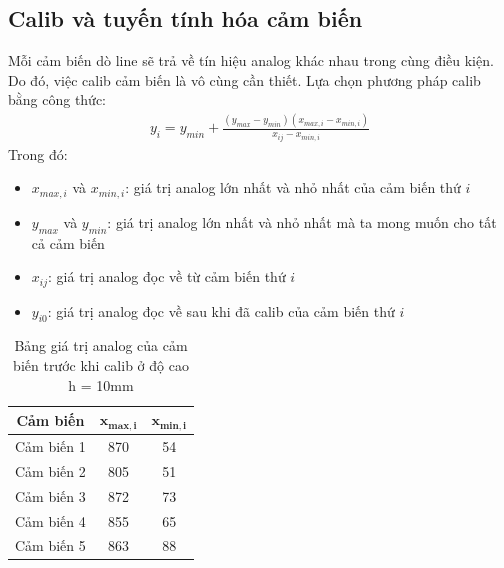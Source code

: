         \subsection{Calib và tuyến tính hóa cảm biến}
            \hspace*{0.6cm}Mỗi cảm biến dò line sẽ trả về tín hiệu analog khác nhau trong cùng điều kiện. Do đó, việc calib cảm biến là vô cùng cần thiết. Lựa chọn phương pháp calib bằng công thức:
            \begin{align}
                y_i = y_{min} + \frac{(y_{max} - y_{min})(x_{max, i} - x_{min, i})}{x_{ij} - x_{min, i}} 
                \label{eq:4-6}
            \end{align}
            Trong đó:
            \begin{itemize}
                \item $x_{max,i}$ và $x_{min,i}$: giá trị analog lớn nhất và nhỏ nhất của cảm biến thứ $i$
                \item $y_{max}$ và $y_{min}$: giá trị analog lớn nhất và nhỏ nhất mà ta mong muốn cho tất cả cảm biến
                \item $x_{ij}$: giá trị analog đọc về từ cảm biến thứ $i$
                \item $y_{i0}$: giá trị analog đọc về sau khi đã calib của cảm biến thứ $i$
            \end{itemize}
            \begin{table}[H]
                \centering
                \begin{tabular}{|c|c|c|}
                    \hline
                    \textbf{Cảm biến} & $\mathbf{x_{max,i}}$ & $\mathbf{x_{min,i}}$  \\
                    \hline
                    Cảm biến 1 & 870 & 54  \\
                    \hline
                    Cảm biến 2 & 805 & 51  \\
                    \hline
                    Cảm biến 3 & 872 & 73  \\
                    \hline
                    Cảm biến 4 & 855 & 65  \\
                    \hline
                    Cảm biến 5 & 863 & 88  \\
                    \hline
                \end{tabular}
                \caption{Bảng giá trị analog của cảm biến trước khi calib ở độ cao h = 10mm}
                \label{tab:4-3}
            \end{table}